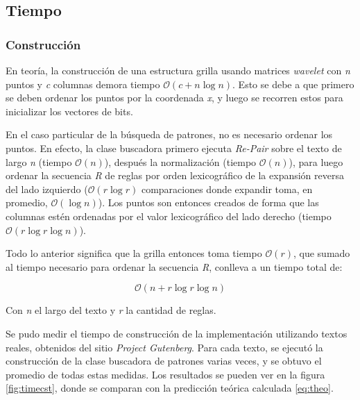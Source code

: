 \subsection{Tiempo}

\subsubsection{Construcción}

En teoría, la construcción de una estructura grilla usando matrices \textit{wavelet} con \textit{n} puntos y \textit{c} columnas demora tiempo $\mathcal{O}(c + n \log{n})$\cite[Capítulo 10.6]{Navarro}. Esto se debe a que primero se deben ordenar los puntos por la coordenada \textit{x}, y luego se recorren estos para inicializar los vectores de bits. 

En el caso particular de la búsqueda de patrones, no es necesario ordenar los puntos. En efecto, la clase buscadora primero ejecuta \textit{Re-Pair} sobre el texto de largo \textit{n} (tiempo $\mathcal{O}(n)$), después la normalización (tiempo $\mathcal{O}(n)$), para luego ordenar la secuencia \textit{R} de reglas por orden lexicográfico de la expansión reversa del lado izquierdo ($\mathcal{O}(r \log r)$ comparaciones donde expandir toma, en promedio, $\mathcal{O}(\log n)$). Los puntos son entonces creados de forma que las columnas estén ordenadas por el valor lexicográfico del lado derecho (tiempo $\mathcal{O}(r \log r \log n)$). 

Todo lo anterior significa que la grilla entonces toma tiempo $\mathcal{O}(r)$, que sumado al tiempo necesario para ordenar la secuencia \textit{R}, conlleva a un tiempo total de:

\begin{equation}
\mathcal{O}(n + r \log r \log n)
\label{eq:theo}
\end{equation}

Con \textit{n} el largo del texto y \textit{r} la cantidad de reglas.

Se pudo medir el tiempo de construcción de la implementación utilizando textos reales, obtenidos del sitio \textit{Project Gutenberg}\cite{guthenberg}. Para cada texto, se ejecutó la construcción de la clase buscadora de patrones varias veces, y se obtuvo el promedio de todas estas medidas. Los resultados se pueden ver en la figura \ref{fig:timecst}, donde se comparan con la predicción teórica calculada \ref{eq:theo}.

